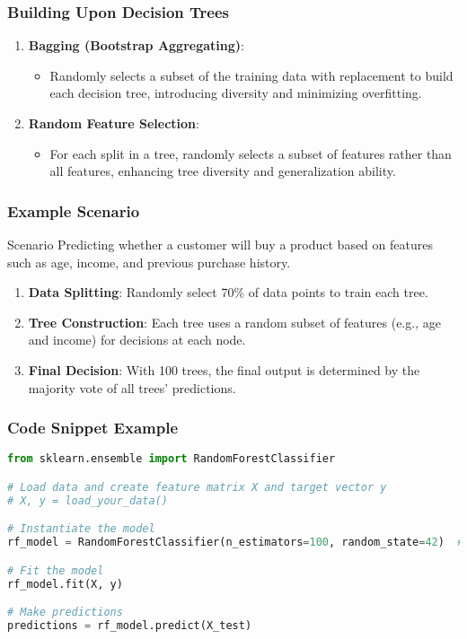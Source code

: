 \documentclass[aspectratio=169]{beamer}
\begin{document}
\begin{frame}
    \frametitle{Building Upon Decision Trees}
    \begin{enumerate}
        \item \textbf{Bagging (Bootstrap Aggregating)}:
        \begin{itemize}
            \item Randomly selects a subset of the training data with replacement to build each decision tree, introducing diversity and minimizing overfitting.
        \end{itemize}
        
        \item \textbf{Random Feature Selection}:
        \begin{itemize}
            \item For each split in a tree, randomly selects a subset of features rather than all features, enhancing tree diversity and generalization ability.
        \end{itemize}
    \end{enumerate}
\end{frame}

\begin{frame}
    \frametitle{Example Scenario}
    \begin{block}{Scenario}
        Predicting whether a customer will buy a product based on features such as age, income, and previous purchase history.
    \end{block}
    \begin{enumerate}
        \item \textbf{Data Splitting}: Randomly select 70\% of data points to train each tree.
        \item \textbf{Tree Construction}: Each tree uses a random subset of features (e.g., age and income) for decisions at each node.
        \item \textbf{Final Decision}: With 100 trees, the final output is determined by the majority vote of all trees' predictions.
    \end{enumerate}
\end{frame}

\begin{frame}[fragile]
    \frametitle{Code Snippet Example}
    \begin{lstlisting}[language=Python]
from sklearn.ensemble import RandomForestClassifier

# Load data and create feature matrix X and target vector y
# X, y = load_your_data()

# Instantiate the model
rf_model = RandomForestClassifier(n_estimators=100, random_state=42)  # 100 trees

# Fit the model
rf_model.fit(X, y)

# Make predictions
predictions = rf_model.predict(X_test)
    \end{lstlisting}
\end{frame}
\end{document}
